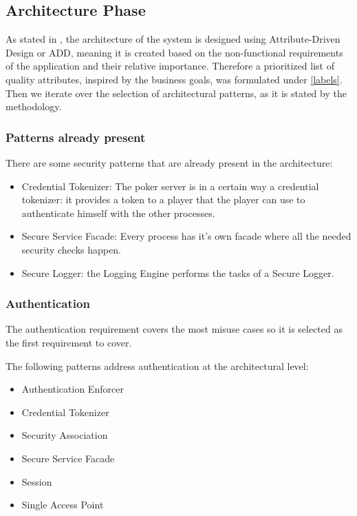 \documentclass[a4paper,11pt]{report}
\begin{document}
\subsection{Architecture Phase}
As stated in \cite[p13]{yskout}, the architecture of the system is designed using Attribute-Driven Design or ADD,
meaning it is created based on the non-functional requirements of the application and their relative importance.
Therefore a prioritized list of quality attributes, inspired by the business goals, was formulated under 
\ref{labels}. Then we iterate over the selection of architectural patterns, as it is stated by the methodology.

\subsubsection{Patterns already present}
There are some security patterns that are already present in the architecture:
\begin{itemize}
\item Credential Tokenizer: The poker server is in a certain way a credential tokenizer: it provides a token to a 
player that the player can use to authenticate himself with the other processes.
\item Secure Service Facade: Every process has it's own facade where all the needed
security checks happen.
\item Secure Logger: the Logging Engine performs the tasks of a Secure Logger.
\end{itemize}

\subsubsection{Authentication}
\label{ArchitectureAuthentication}
The authentication requirement covers the most misuse cases so it is selected as the first requirement to cover.

The following patterns address authentication at the architectural level:
\begin{itemize}
\item Authentication Enforcer
\item Credential Tokenizer
\item Security Association
\item Secure Service Facade
\item Session
\item Single Access Point
\end{itemize}
\end{document}
